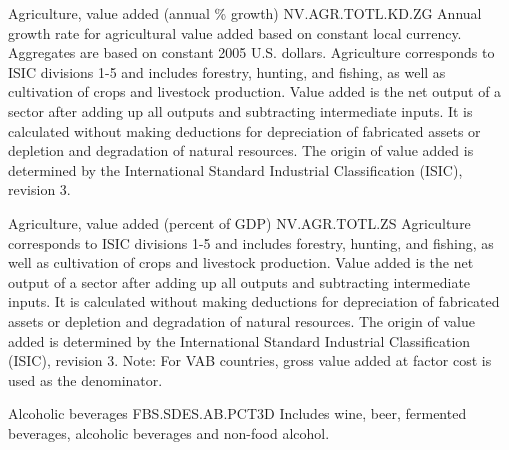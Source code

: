 \begin{MetadataCollection}
\begin{metadata}{ Agriculture, value added (annual \% growth) }{ NV.AGR.TOTL.KD.ZG }
Annual growth rate for agricultural value added based on constant local currency. Aggregates are based on constant 2005 U.S. dollars. Agriculture corresponds to ISIC divisions 1-5 and includes forestry, hunting, and fishing, as well as cultivation of crops and livestock production. Value added is the net output of a sector after adding up all outputs and subtracting intermediate inputs. It is calculated without making deductions for depreciation of fabricated assets or depletion and degradation of natural resources. The origin of value added is determined by the International Standard Industrial Classification (ISIC), revision 3. 
\end{metadata}

\begin{metadata}{ Agriculture, value added (percent of GDP) }{ NV.AGR.TOTL.ZS }
Agriculture corresponds to ISIC divisions 1-5 and includes forestry, hunting, and fishing, as well as cultivation of crops and livestock production. Value added is the net output of a sector after adding up all outputs and subtracting intermediate inputs. It is calculated without making deductions for depreciation of fabricated assets or depletion and degradation of natural resources. The origin of value added is determined by the International Standard Industrial Classification (ISIC), revision 3. Note: For VAB countries, gross value added at factor cost is used as the denominator. 
\end{metadata}

\begin{metadata}{ Alcoholic beverages }{ FBS.SDES.AB.PCT3D }
Includes wine, beer, fermented beverages, alcoholic beverages and non-food alcohol. 
\end{metadata}


\end{MetadataCollection}
